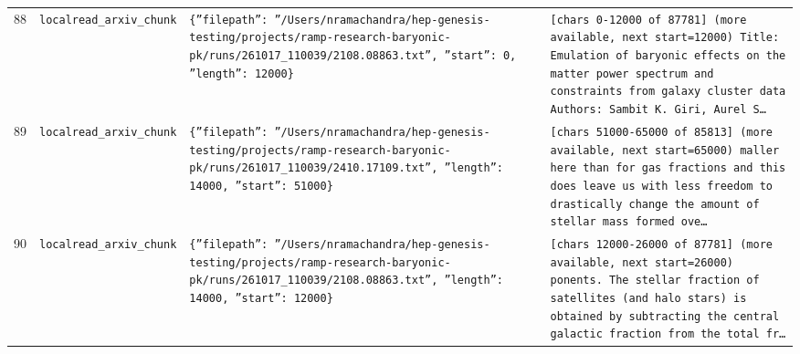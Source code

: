 \documentclass[11pt,a4paper]{article}
\begin{document}
\begin{longtable}{@{}p{}p{}p{}p{}@{}}
88 & \texttt{local}\newline\texttt{read\_\allowbreak{}arxiv\_\allowbreak{}chunk} & \texttt{\{''filepath'':\allowbreak{} ''/\allowbreak{}Users/\allowbreak{}nramachandra/\allowbreak{}hep-genesis-testing/\allowbreak{}projects/\allowbreak{}ramp-research-baryonic-pk/\allowbreak{}runs/\allowbreak{}261017\_\allowbreak{}110039/\allowbreak{}2108.08863.txt'',\allowbreak{} ''start'':\allowbreak{} 0,\allowbreak{} ''length'':\allowbreak{} 12000\}\allowbreak{}} & \texttt{[chars 0-12000 of 87781]\allowbreak{} (more available,\allowbreak{} next start=\allowbreak{}12000)\allowbreak{}  Title:\allowbreak{} Emulation of baryonic effects on the matter power spectrum and constraints from galaxy cluster data Authors:\allowbreak{} Sambit K. Giri,\allowbreak{} Aurel S\ldots{}\allowbreak{}} \\
89 & \texttt{local}\newline\texttt{read\_\allowbreak{}arxiv\_\allowbreak{}chunk} & \texttt{\{''filepath'':\allowbreak{} ''/\allowbreak{}Users/\allowbreak{}nramachandra/\allowbreak{}hep-genesis-testing/\allowbreak{}projects/\allowbreak{}ramp-research-baryonic-pk/\allowbreak{}runs/\allowbreak{}261017\_\allowbreak{}110039/\allowbreak{}2410.17109.txt'',\allowbreak{} ''length'':\allowbreak{} 14000,\allowbreak{} ''start'':\allowbreak{} 51000\}\allowbreak{}} & \texttt{[chars 51000-65000 of 85813]\allowbreak{} (more available,\allowbreak{} next start=\allowbreak{}65000)\allowbreak{}  maller here than for gas fractions and this does leave us with less freedom to drastically change the amount of stellar mass formed ove\ldots{}\allowbreak{}} \\
90 & \texttt{local}\newline\texttt{read\_\allowbreak{}arxiv\_\allowbreak{}chunk} & \texttt{\{''filepath'':\allowbreak{} ''/\allowbreak{}Users/\allowbreak{}nramachandra/\allowbreak{}hep-genesis-testing/\allowbreak{}projects/\allowbreak{}ramp-research-baryonic-pk/\allowbreak{}runs/\allowbreak{}261017\_\allowbreak{}110039/\allowbreak{}2108.08863.txt'',\allowbreak{} ''length'':\allowbreak{} 14000,\allowbreak{} ''start'':\allowbreak{} 12000\}\allowbreak{}} & \texttt{[chars 12000-26000 of 87781]\allowbreak{} (more available,\allowbreak{} next start=\allowbreak{}26000)\allowbreak{}  ponents. The stellar fraction of satellites (and halo stars)\allowbreak{} is obtained by subtracting the central galactic fraction from the total fr\ldots{}\allowbreak{}} \\

\end{longtable}
\end{document}
